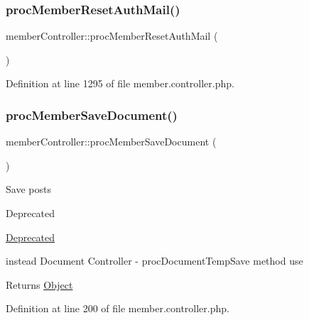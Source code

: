 \subsubsection{\texorpdfstring{proc\+Member\+Reset\+Auth\+Mail()}{procMemberResetAuthMail()}}
{\footnotesize\ttfamily member\+Controller\+::proc\+Member\+Reset\+Auth\+Mail (\begin{DoxyParamCaption}{ }\end{DoxyParamCaption})}



Definition at line 1295 of file member.\+controller.\+php.

\mbox{\label{classmemberController_abe77500da26f14cd629ca373f94e04d1}} 
\subsubsection{\texorpdfstring{proc\+Member\+Save\+Document()}{procMemberSaveDocument()}}
{\footnotesize\ttfamily member\+Controller\+::proc\+Member\+Save\+Document (\begin{DoxyParamCaption}{ }\end{DoxyParamCaption})}

Save posts \begin{DoxyRefDesc}{Deprecated}
\item[\hyperlink{deprecated__deprecated000025}{Deprecated}]
\begin{DoxyItemize}
\item instead Document Controller -\/ proc\+Document\+Temp\+Save method use 
\end{DoxyItemize}\end{DoxyRefDesc}
\begin{DoxyReturn}{Returns}
\hyperlink{classObject}{Object} 
\end{DoxyReturn}


Definition at line 200 of file member.\+controller.\+php.

\mbox{\label{classmemberController_a7c582f99e2bda6a956a7a2a33a01c6c6}} 
